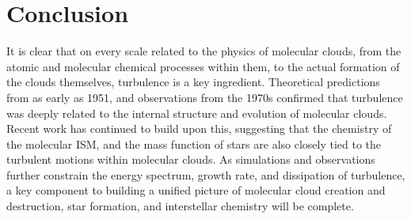 \documentclass[12pt, preprint]{aastex}
\begin{document}
\section{Conclusion}
It is clear that on every scale related to the physics of molecular clouds, from
the atomic and molecular chemical processes within them, to the actual formation
of the clouds themselves, turbulence is a key ingredient.  Theoretical
predictions from as early as 1951, and observations from the 1970s confirmed
that turbulence was deeply related to the internal structure and evolution of
molecular clouds.  Recent work has continued to build upon this, suggesting that
the chemistry of the molecular ISM, and the mass function of stars are also 
closely tied to the turbulent motions within molecular clouds.  As simulations
and observations further constrain the energy spectrum, growth rate, and
dissipation of turbulence, a key component to building a unified picture 
of molecular cloud creation and destruction, star formation, and interstellar 
chemistry will be complete.
\end{document}
